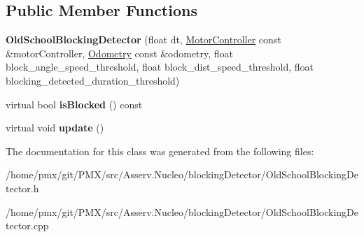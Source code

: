 \subsection*{Public Member Functions}
\begin{DoxyCompactItemize}
\item 
\mbox{\label{classOldSchoolBlockingDetector_a71d6aa26353b6f22e216ff259b64ad9e}} 
{\bfseries Old\+School\+Blocking\+Detector} (float dt, \hyperlink{classMotorController}{Motor\+Controller} const \&motor\+Controller, \hyperlink{classOdometry}{Odometry} const \&odometry, float block\+\_\+angle\+\_\+speed\+\_\+threshold, float block\+\_\+dist\+\_\+speed\+\_\+threshold, float blocking\+\_\+detected\+\_\+duration\+\_\+threshold)
\item 
\mbox{\label{classOldSchoolBlockingDetector_a7628f7ad57433ba4138ec0c4f1403870}} 
virtual bool {\bfseries is\+Blocked} () const
\item 
\mbox{\label{classOldSchoolBlockingDetector_aea520e1efcff86600d7f2e298eb65159}} 
virtual void {\bfseries update} ()
\end{DoxyCompactItemize}


The documentation for this class was generated from the following files\+:\begin{DoxyCompactItemize}
\item 
/home/pmx/git/\+P\+M\+X/src/\+Asserv.\+Nucleo/blocking\+Detector/Old\+School\+Blocking\+Detector.\+h\item 
/home/pmx/git/\+P\+M\+X/src/\+Asserv.\+Nucleo/blocking\+Detector/Old\+School\+Blocking\+Detector.\+cpp\end{DoxyCompactItemize}
